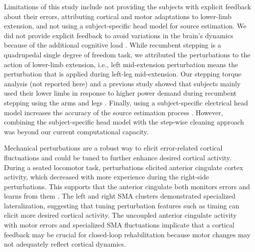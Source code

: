\documentclass[shortpaper,twoside,web]{ieeecolor}
\begin{document}
Limitations of this study include not providing the subjects with explicit feedback about their errors, attributing cortical and motor adaptations to lower-limb extension, and not using a subject-specific head model for source estimation. We did not provide explicit feedback to avoid variations in the brain’s dynamics because of the additional cognitive load \cite{Kline2014-pt}. While recumbent stepping is a quadrupedal single degree of freedom task, we attributed the perturbations to the action of lower-limb extension, i.e., left mid-extension perturbation means the perturbation that is applied during left-leg mid-extension. Our stepping torque analysis (not reported here) and a previous study showed that subjects mainly used their lower limbs in response to higher power demand during recumbent stepping using the arms and legs \cite{Skinner2014-cl}. Finally, using a subject-specific electrical head model increases the accuracy of the source estimation process \cite{Akalin_Acar2013-rv}. However, combining the subject-specific head model with the step-wise cleaning approach was beyond our current computational capacity.

Mechanical perturbations are a robust way to elicit error-related cortical fluctuations and could be tuned to further enhance desired cortical activity. During a seated locomotor task, perturbations elicited anterior cingulate cortex activity, which decreased with more experience during the right-side perturbations. This supports that the anterior cingulate both monitors errors and learns from them \cite{Holroyd2002-fl}. The left and right SMA clusters demonstrated specialized lateralization, suggesting that tuning perturbation features such as timing can elicit more desired cortical activity. The uncoupled anterior cingulate activity with motor errors and specialized SMA fluctuations implicate that a cortical feedback may be crucial for closed-loop rehabilitation because motor changes may not adequately reflect cortical dynamics.




\end{document}
